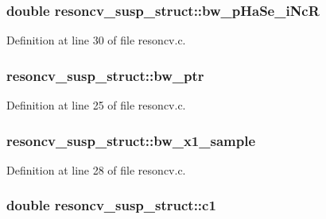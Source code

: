 \subsubsection[{\texorpdfstring{bw\+\_\+p\+Ha\+Se\+\_\+i\+NcR}{bw_pHaSe_iNcR}}]{\setlength{\rightskip}{0pt plus 5cm}double resoncv\+\_\+susp\+\_\+struct\+::bw\+\_\+p\+Ha\+Se\+\_\+i\+NcR}\hypertarget{structresoncv__susp__struct_a280955fc73e0043e9fae8925ddd203d5}{}\label{structresoncv__susp__struct_a280955fc73e0043e9fae8925ddd203d5}


Definition at line 30 of file resoncv.\+c.

\subsubsection[{\texorpdfstring{bw\+\_\+ptr}{bw_ptr}}]{ resoncv\+\_\+susp\+\_\+struct\+::bw\+\_\+ptr}\hypertarget{structresoncv__susp__struct_a43fae13b4d6ce1c27a17089392321b14}{}\label{structresoncv__susp__struct_a43fae13b4d6ce1c27a17089392321b14}


Definition at line 25 of file resoncv.\+c.

\subsubsection[{\texorpdfstring{bw\+\_\+x1\+\_\+sample}{bw_x1_sample}}]{ resoncv\+\_\+susp\+\_\+struct\+::bw\+\_\+x1\+\_\+sample}\hypertarget{structresoncv__susp__struct_a9a787db7571579b05b957be71cb733f3}{}\label{structresoncv__susp__struct_a9a787db7571579b05b957be71cb733f3}


Definition at line 28 of file resoncv.\+c.

\subsubsection[{\texorpdfstring{c1}{c1}}]{\setlength{\rightskip}{0pt plus 5cm}double resoncv\+\_\+susp\+\_\+struct\+::c1}\hypertarget{structresoncv__susp__struct_a1e550c4ea40d487febddc4a4409c70bc}{}\label{structresoncv__susp__struct_a1e550c4ea40d487febddc4a4409c70bc}


